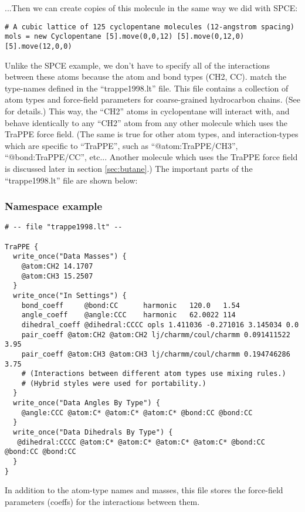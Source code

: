 \documentclass[11pt]{article}
\begin{document}
...Then we can create copies of this molecule in the same way we did with SPCE:
\begin{verbatim}
# A cubic lattice of 125 cyclopentane molecules (12-angstrom spacing)
mols = new Cyclopentane [5].move(0,0,12) [5].move(0,12,0) [5].move(12,0,0)
\end{verbatim}
Unlike the SPCE example, we don't have to specify all of the interactions 
between these atoms because the atom and bond types (CH2, CC).
match the type-names defined in the ``trappe1998.lt'' file.
This file contains a collection of atom types and
force-field parameters for coarse-grained hydrocarbon chains.
(See \cite{TraPPE} for details.)
This way, the ``CH2'' atoms in cyclopentane will interact with, 
and behave identically to any ``CH2'' atom from any other molecule 
which uses the TraPPE force field.
(The same is true for other atom types, and interaction-types 
 which are specific to ``TraPPE'', such as
``@atom:TraPPE/CH3'', ``@bond:TraPPE/CC'', etc...
Another molecule which uses the TraPPE force field is discussed 
later in section \ref{sec:butane}.)
The important parts of the ``trappe1998.lt'' file are shown below:
\subsubsection{Namespace example}
\label{sec:trappe}
\begin{verbatim}
# -- file "trappe1998.lt" --

TraPPE {
  write_once("Data Masses") {
    @atom:CH2 14.1707
    @atom:CH3 15.2507
  }
  write_once("In Settings") {
    bond_coeff     @bond:CC      harmonic   120.0   1.54
    angle_coeff    @angle:CCC    harmonic   62.0022 114
    dihedral_coeff @dihedral:CCCC opls 1.411036 -0.271016 3.145034 0.0
    pair_coeff @atom:CH2 @atom:CH2 lj/charmm/coul/charmm 0.091411522 3.95
    pair_coeff @atom:CH3 @atom:CH3 lj/charmm/coul/charmm 0.194746286 3.75
    # (Interactions between different atom types use mixing rules.)
    # (Hybrid styles were used for portability.)
  }
  write_once("Data Angles By Type") {
    @angle:CCC @atom:C* @atom:C* @atom:C* @bond:CC @bond:CC
  }
  write_once("Data Dihedrals By Type") {
   @dihedral:CCCC @atom:C* @atom:C* @atom:C* @atom:C* @bond:CC @bond:CC @bond:CC
  }
}
\end{verbatim}
In addition to the atom-type names and masses, 
this file stores the force-field parameters (coeffs) for the 
interactions between them.
\end{document}
